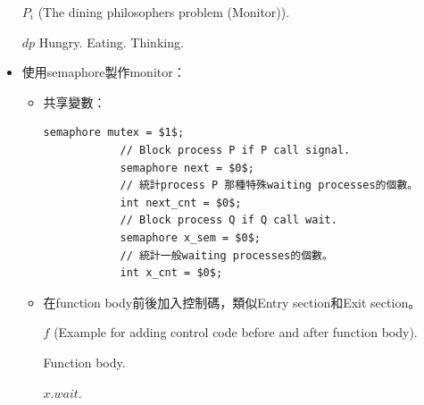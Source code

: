 \begin{itemize}
\begin{algorithm}[H]
        \caption{$P_i$ (The dining philosophers problem (Monitor)).}
        \begin{algorithmic}[1]
                \State {} $dp$ 
                \Repeat
                    \State Hungry. 
                    \State {} 
                    \State Eating. 
                    \State {} 
                    \State Thinking. 
            \EndFunction
        \end{algorithmic}
    \end{algorithm}
    \item 使用semaphore製作monitor：\begin{itemize}
        \item 共享變數：\begin{lstlisting}[caption={Shared variables of making monitor using semaphore.}, captionpos=b, mathescape=true]
            semaphore mutex = $1$;
            // Block process P if P call signal. 
            semaphore next = $0$;
            // 統計process P 那種特殊waiting processes的個數。 
            int next_cnt = $0$;
            // Block process Q if Q call wait.
            semaphore x_sem = $0$;
            // 統計一般waiting processes的個數。
            int x_cnt = $0$; 
        \end{lstlisting}
        \item 在function body前後加入控制碼，類似Entry section和Exit section。
        \begin{algorithm}[H]
            \caption{$f$ (Example for adding control code before and after function body).}
            \begin{algorithmic}[1]
                    \State {}
                    \State Function body.
                        \State {}
                    \Else
                        \State {}
                    \EndIf
                \EndFunction
            \end{algorithmic}
        \end{algorithm}
        \begin{algorithm}[H]
            \caption{$x.wait$.}
            \begin{algorithmic}[1]

\end{algorithmic}
\end{algorithm}
\end{itemize}
\end{itemize}

